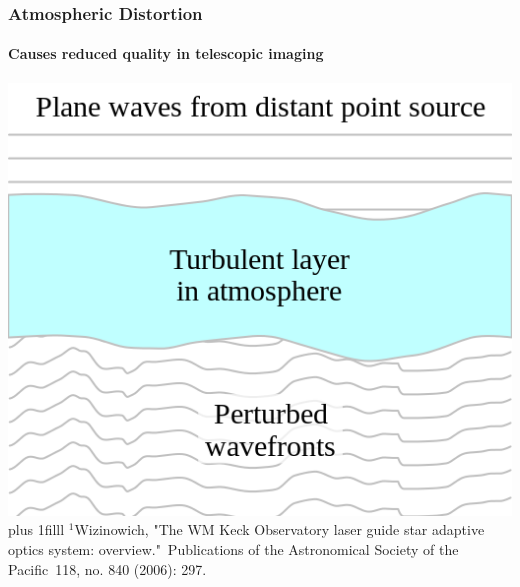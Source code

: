 \documentclass{beamer}
\newcommand{\btVFill}{\vskip0pt plus 1filll}
\begin{document}
\begin{frame}
  \frametitle{Atmospheric Distortion}
  \framesubtitle{Causes reduced quality in telescopic imaging}
  \center
  \includegraphics[scale = .35]{Images/adaptiveoptics1.png}
	  \bigskip
	  \btVFill
	  {\tiny $^1$Wizinowich, "The WM Keck Observatory laser guide star adaptive optics system: overview." Publications of the Astronomical Society of the Pacific 118, no. 840 (2006): 297.
}
\end{frame}
\end{document}
